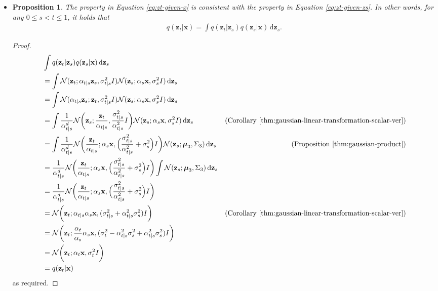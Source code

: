 \documentclass[10pt]{article}
\newtheorem{proposition}[lemma]{Proposition}
\newcommand{\dee}{\mathrm{d}}
\newcommand{\ve}[1]{\mathbf{#1}}
\newcommand{\ves}[1]{\boldsymbol{#1}}
\newcommand{\N}{\mathcal{N}}
\begin{document}
\begin{itemize}
\item \begin{proposition} \label{thm:zt-x-consistency}
  The property in Equation \eqref{eq:zt-given-x} is consistent with the property in Equation \eqref{eq:zt-given-zs}. In other words, for any $0 \leq s < t \leq 1$, it holds that
  \begin{align*}
    q(\ve{z}_t | \ve{x}) = \int q(\ve{z}_t|\ve{z}_s) q(\ve{z}_s|\ve{x})\, \dee \ve{z}_s.
  \end{align*}
\end{proposition}

\begin{proof}
\begin{align*}
  &\int q(\ve{z}_t|\ve{z}_s) q(\ve{z}_s|\ve{x})\, \dee \ve{z}_s \\
  &= \int \N(\ve{z}_t ; \alpha_{t|s}\ve{z}_s, \sigma^2_{t|s} I) \N(\ve{z}_s ; \alpha_s \ve{x}, \sigma_s^2 I) \, \dee \ve{z}_s\\
  &= \int \N(\alpha_{t|s}\ve{z}_s ; \ve{z}_t, \sigma^2_{t|s} I) \N(\ve{z}_s ; \alpha_s \ve{x}, \sigma_s^2 I) \, \dee \ve{z}_s\\
  &= \int \frac{1}{\alpha_{t|s}^d} \N\bigg(\ve{z}_s ; \frac{\ve{z}_t}{\alpha_{t|s}}, \frac{\sigma^2_{t|s}}{\alpha_{t|s}^2} I\bigg) \N(\ve{z}_s ; \alpha_s \ve{x}, \sigma_s^2 I) \, \dee \ve{z}_s& (\mbox{Corollary }\ref{thm:gaussian-linear-transformation-scalar-ver}) \\
  &= \int \frac{1}{\alpha_{t|s}^d} \N\bigg( \frac{\ve{z}_t}{\alpha_{t|s}} ; \alpha_s \ve{x}, \Big( \frac{\sigma_{t|s}^2}{\alpha_{t|s}^2} + \sigma_s^2 \Big) I \bigg) \N(\ve{z}_s ; \ves{\mu}_3, \Sigma_3) \, \dee \ve{z}_s& (\mbox{Proposition }\ref{thm:gaussian-product}) \\
  &= \frac{1}{\alpha_{t|s}^d} \N\bigg( \frac{\ve{z}_t}{\alpha_{t|s}} ; \alpha_s \ve{x}, \Big( \frac{\sigma_{t|s}^2}{\alpha_{t|s}^2} + \sigma_s^2 \Big) I \bigg) \int \N(\ve{z}_s ; \ves{\mu}_3, \Sigma_3) \, \dee \ve{z}_s\\
  &= \frac{1}{\alpha_{t|s}^d} \N\bigg( \frac{\ve{z}_t}{\alpha_{t|s}} ; \alpha_s \ve{x}, \Big( \frac{\sigma_{t|s}^2}{\alpha_{t|s}^2} + \sigma_s^2 \Big) I \bigg) \\
  &= \N\bigg( \ve{z}_t ; \alpha_{t|s} \alpha_s \ve{x}, ( \sigma_{t|s}^2 + \alpha_{t|s}^2 \sigma_s^2 ) I \bigg) & (\mbox{Corollary }\ref{thm:gaussian-linear-transformation-scalar-ver}) \\
  &= \N\bigg( \ve{z}_t ; \frac{\alpha_t}{\alpha_s} \alpha_s \ve{x}, ( \sigma_t^2 - \alpha_{t|s}^2 \sigma_s^2 + \alpha_{t|s}^2 \sigma_s^2 ) I \bigg) \\
  &= \N\bigg( \ve{z}_t ; \alpha_t \ve{x}, \sigma_t^2  I \bigg) \\
  &= q(\ve{z}_t | \ve{x})
\end{align*}
as required.
\end{proof}


\end{itemize}
\end{document}
